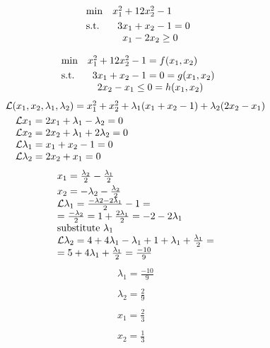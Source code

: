 \[
  \begin{array}{ll@{}r@{}l}
    \text{min} & x_1^{2} + 12x_2^{2} - 1 \\[\jot]
    \text{s.t.}& \phantom{15}\llap{3}x_1 +  x_2 - 1 = 0 \\
    &    \phantom{15}x_1 - 2 x_2  \geq 0 \\
  \end{array}
\]

\[
  \begin{array}{ll@{}r@{}l}
    \text{min} & x_1^{2} + 12x_2^{2} - 1 = f(x_1, x_2)\\[\jot]
    \text{s.t.}& \phantom{15}\llap{3}x_1 +  x_2 - 1 = 0 = g(x_1, x_2) \\
    &    \phantom{15}2 x_2 - x_1  \leq 0 = h(x_1, x_2)\\
  \end{array}
\]
\[
  \begin{array}{l}
    \mathcal{L}(x_1, x_2, \lambda_1, \lambda_2) = x_1^{2} + x_2^{2} + \lambda_1(x_1 + x_2 - 1) + \lambda_2(2x_2 - x_1) \\[\jot]
     \phantom{15}\mathcal{L}x_1 = 2x_1 + \lambda_1 - \lambda_2 = 0 \\
     \phantom{15}\mathcal{L}x_2 = 2x_2 + \lambda_1 + 2\lambda_2 = 0 \\		
     \phantom{15}\mathcal{L}\lambda_1 = x_1 + x_2 -1 = 0 \\
     \phantom{15}\mathcal{L}\lambda_2= 2x_2 + x_1 = 0 \\
  \end{array}
\]
\[
  \begin{array}{l}
     x_1 = \frac{\lambda_2}{2} - \frac{\lambda_1}{2}\\[\jot]
     x_2 = - \lambda_2 - \frac{\lambda_2}{2} \\
     \mathcal{L}\lambda_1 =\frac{-\lambda2 - 2\lambda_1}{2} -1 =   \\
      = \frac{-\lambda_2}{2} = 1 + \frac{2\lambda_1}{2} = -2 -2\lambda_1\\
     \text{substitute $\lambda_1$}\\
     \mathcal{L}\lambda_2 = 4 + 4\lambda_1 - \lambda_1 + 1 + \lambda_1 + \frac{\lambda_1}{2} =\\
     = 5 + 4\lambda_1 + \frac{\lambda_1}{2} = \frac{-10}{9}\\
    	
  \end{array}
\]
\[
	\begin{array}{l}
		 \lambda_1 = \frac{-10}{9}\\\\
   		 \lambda_2 = \frac{2}{9}\\\\
   		 x_1 = \frac{2}{3}\\\\
   		 x_2 = \frac{1}{3}
	\end{array}
\]

